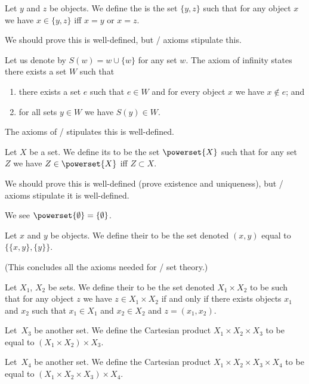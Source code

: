 \begin{axiom}
Let $y$ and $z$ be objects. We define the  is
the set $\{y,z\}$ such that for any object $x$ we have $x\in\{y,z\}$
iff $x=y$ or $x=z$.

We should prove this is well-defined, but \ZF/ axioms stipulate this.
\end{axiom}

\begin{axiom}[Infinity]
Let us denote by $S(w)=w\cup\{w\}$ for any set $w$.
The axiom of infinity states there exists a set $W$ such that 
\begin{enumerate}
\item there exists a set $e$ such that $e\in W$ and for every object
  $x$ we have $x\notin e$; and
\item for all sets $y\in W$ we have $S(y)\in W$.
\end{enumerate}
The axioms of \ZF/ stipulates this is well-defined.
\end{axiom}

\begin{axiom}[Powerset]
Let $X$ be a set. We define its  to be the set
$\powerset{X}$ such that for any set $Z$ we have $Z\in\powerset{X}$
iff $Z\subset X$.

We should prove this is well-defined (prove existence and uniqueness),
but \ZF/ axioms stipulate it is well-defined.
\end{axiom}

\begin{theorem}
We see $\powerset{\emptyset}=\{\emptyset\}$.
\end{theorem}

\begin{definition}
Let $x$ and $y$ be objects. We define their  to
be the set denoted $(x,y)$ equal to $\{\{x,y\},\{y\}\}$.
\end{definition}

(This concludes all the axioms needed for \ZF/ set theory.)

\begin{definition}
Let $X_{1}$, $X_{2}$ be sets. 
We define their  to be the set denoted
$X_{1}\times X_{2}$ to be such that
for any object $z$ we have $z\in X_{1}\times X_{2}$ if and only if
there exists objects $x_{1}$ and $x_{2}$ such that $x_{1}\in X_{1}$
and $x_{2}\in X_{2}$ and $z=(x_{1},x_{2})$.

Let\ $X_{3}$ be another set. We define the Cartesian product
$X_{1}\times X_{2}\times X_{3}$ to be equal to $(X_{1}\times X_{2})\times X_{3}$.

Let\ $X_{4}$ be another set. We define the Cartesian product
$X_{1}\times X_{2}\times X_{3}\times X_{4}$ to be equal to
$(X_{1}\times X_{2}\times X_{3})\times X_{4}$.
\end{definition}

